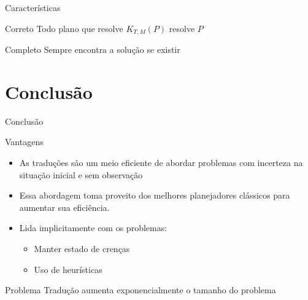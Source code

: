 \begin{frame}{Características}
    \begin{exampleblock}{Correto}
        Todo plano que resolve $K_{T,M}(P)$ resolve $P$
    \end{exampleblock}
    \begin{exampleblock}{Completo}
        Sempre encontra a solução se existir
    \end{exampleblock}
    
    
\end{frame}

\section{Conclusão}
\begin{frame}{Conclusão}
    \begin{exampleblock}{Vantagens}
        \begin{itemize}
            \item As traduções são um meio eficiente de abordar problemas com incerteza na situação inicial e sem observação
            \item Essa abordagem toma proveito dos melhores planejadores clássicos para aumentar sua eficiência.
            \item Lida implicitamente com os problemas:
            \begin{itemize}
                \item Manter estado de crenças
                \item Uso de heurísticas
            \end{itemize}
        \end{itemize}
    \end{exampleblock}
    \begin{alertblock}{Problema}
        Tradução aumenta exponencialmente o tamanho do problema
    \end{alertblock}
\end{frame} 
